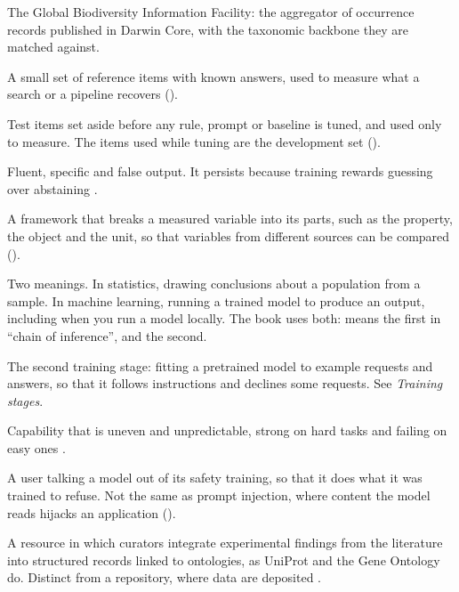 \begin{description}[itemsep=0.2em]
\item[GBIF] The Global Biodiversity Information Facility: the aggregator of
  occurrence records published in Darwin Core, with the taxonomic backbone
  they are matched against.

\item[Gold set] A small set of reference items with known answers, used to
  measure what a search or a pipeline recovers ().

\item[Held-out set] Test items set aside before any rule, prompt or baseline
  is tuned, and used only to measure. The items used while tuning are the
  development set ().

\item[Hallucination] Fluent, specific and false output. It persists because
  training rewards guessing over abstaining \parencite{kalai2025hallucinate}.

\item[I-ADOPT] A framework that breaks a measured variable into its parts,
  such as the property, the object and the unit, so that variables from
  different sources can be compared ().

\item[Inference] Two meanings. In statistics, drawing conclusions about a
  population from a sample. In machine learning, running a trained model to
  produce an output, including when you run a model locally. The book uses
  both:  means the first in ``chain of inference'',
  and  the second.

\item[Instruction tuning] The second training stage: fitting a pretrained
  model to example requests and answers, so that it follows instructions and
  declines some requests. See \emph{Training stages}.

\item[Jagged intelligence] Capability that is uneven and unpredictable, strong on
  hard tasks and failing on easy ones \parencite{mitchell2026jagged}.

\item[Jailbreaking] A user talking a model out of its safety training, so that
  it does what it was trained to refuse. Not the same as prompt injection,
  where content the model reads hijacks an application ().

\item[Knowledgebase] A resource in which curators integrate experimental
  findings from the literature into structured records linked to ontologies,
  as UniProt and the Gene Ontology do. Distinct from a repository, where data
  are deposited \parencite{pombase2026curation}.


\end{description}
